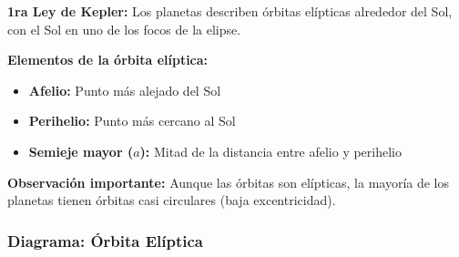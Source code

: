 \begin{seccion}
\textbf{1ra Ley de Kepler:} Los planetas describen órbitas elípticas alrededor del Sol, con el Sol en uno de los focos de la elipse.

\begin{ecuacion}
\textbf{Elementos de la órbita elíptica:}
\begin{itemize}
    \item \textbf{Afelio:} Punto más alejado del Sol
    \item \textbf{Perihelio:} Punto más cercano al Sol
    \item \textbf{Semieje mayor ($a$):} Mitad de la distancia entre afelio y perihelio
\end{itemize}
\end{ecuacion}

\begin{nota}
    \textbf{Observación importante:} Aunque las órbitas son elípticas, la mayoría de los planetas tienen órbitas casi circulares (baja excentricidad).
\end{nota}

\end{seccion}

\subsubsection{Diagrama: Órbita Elíptica}

\begin{center}
\shorthandoff{>}\shorthandoff{<}
\shorthandon{>}\shorthandon{<}
\end{center}

